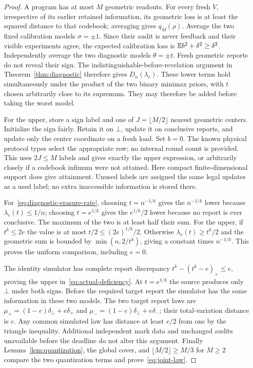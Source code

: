 \begin{proof}
A program has at most $M$ geometric readouts. For every fresh $V$, irrespective of its earlier retained information, its geometric loss is at least the squared distance to that codebook; averaging gives $q_M(\rho)$. Average the two fixed calibration models $\sigma=\pm1$. Since their audit is never feedback and their visible experiments agree, the expected calibration loss is $\mathbb E b^2+\delta^2\ge\delta^2$. Independently average the two diagnostic models $\theta=\pm t$. Fresh geometric reports do not reveal their sign. The indistinguishable-before-revelation argument in Theorem~\ref{thm:diagnostic} therefore gives $D_n(\lambda_e)$. These lower terms hold simultaneously under the product of the two binary minimax priors, with $t$ chosen arbitrarily close to its supremum. They may therefore be added before taking the worst model.

For the upper, store a sign label and one of $J=\lfloor M/2\rfloor$ nearest geometric centers. Initialize the sign fairly. Retain it on $\bot$, update it on conclusive reports, and update only the center coordinate on a fresh load. Set $b=0$. The known physical protocol types select the appropriate row; no internal round count is provided. This uses $2J\le M$ labels and gives exactly the upper expression, or arbitrarily closely if a codebook infimum were not attained. Here compact finite-dimensional support does give attainment. Unused labels are assigned the same legal updates as a used label; no extra inaccessible information is stored there.

For~\eqref{eq:diagnostic-erasure-rate}, choosing $t=n^{-1/k}$ gives the $n^{-1/k}$ lower because $\lambda_e(t)\le1/n$; choosing $t=e^{1/k}$ gives the $e^{1/k}/2$ lower because no report is ever conclusive. The maximum of the two is at least half their sum. For the upper, if $t^k\le2e$ the value is at most $t/2\le(2e)^{1/k}/2$. Otherwise $\lambda_e(t)\ge t^k/2$ and the geometric sum is bounded by $\min(n,2/t^k)$, giving a constant times $n^{-1/k}$. This proves the uniform comparison, including $e=0$.

The identity simulator has complete report discrepancy $t^k-(t^k-e)_+\le e$, proving the upper in~\eqref{eq:actual-deficiency}. At $t=e^{1/k}$ the source produces only $\bot$ under both signs. Before the required target report the simulator has the same information in these two models. The two target report laws are $\mu_+=(1-e)\delta_\bot+e\delta_+$ and $\mu_-=(1-e)\delta_\bot+e\delta_-$; their total-variation distance is $e$. Any common simulated law has distance at least $e/2$ from one by the triangle inequality. Additional independent mark data and unchanged audits unavailable before the deadline do not alter this argument. Finally Lemma~\ref{lem:quantization}, the global cover, and $\lfloor M/2\rfloor\ge M/3$ for $M\ge2$ compare the two quantization terms and prove~\eqref{eq:joint-law}.
\end{proof}
